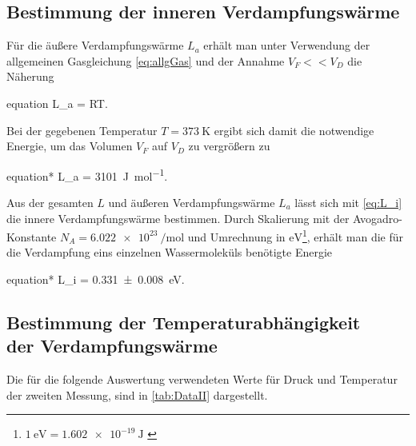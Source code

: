 	\subsection{Bestimmung der inneren Verdampfungswärme}
	Für die äußere Verdampfungswärme $L_{a}$ erhält man unter Verwendung der allgemeinen
	Gasgleichung \eqref{eq:allgGas} und der Annahme $V_{F} << V_{D} $ die Näherung
	\begin{empheq}{equation}
	 	\label{eq:L_a}
	 	L_{a} = RT.
	\end{empheq}
	Bei der gegebenen Temperatur $T = \SI{373}{\kelvin}$ ergibt sich damit die notwendige 
	Energie, um das Volumen $V_{F}$ auf $V_{D}$ zu vergrößern zu
	\begin{empheq}{equation*}
		 	L_{a} =  \SI{3101}{\joule\per\mole}\;.
    \end{empheq}  
	Aus der gesamten $L$ und  äußeren Verdampfungswärme $L_{a}$ lässt sich mit \eqref{eq:L_i}
	die innere Verdampfungswärme bestimmen. Durch Skalierung mit der Avogadro-Konstante 
	$N_{A} = \SI{6.022e23}{\per\mole}$ \cite{SciPy} und Umrechnung in $\si{\eV}$\footnote{$\SI{1}{\eV} = \SI{1.602e-19}{\joule}$ \cite{SciPy}},
	erhält man die für die Verdampfung eins einzelnen Wassermoleküls benötigte Energie
	\begin{empheq}{equation*}
			 	L_{i} =  \SI{0.331(8)}{\eV}\;.
	\end{empheq} 
	
	
\subsection{Bestimmung der Temperaturabhängigkeit\\ der Verdampfungswärme}
	Die für die folgende Auswertung verwendeten Werte für Druck und Temperatur der zweiten Messung, sind in
	\autoref{tab:DataII} dargestellt. 
	
